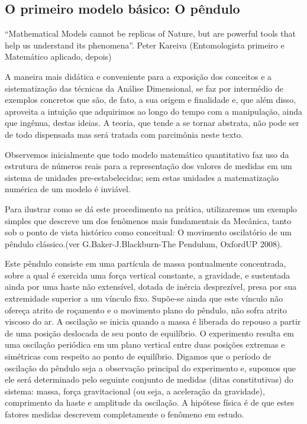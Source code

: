 \subsection{O primeiro modelo básico: O pêndulo}

“Mathematical Models cannot be replicas of Nature, but are powerful tools that help us understand its phenomena”.
Peter Kareiva (Entomologista primeiro e Matemático aplicado, depois)

A maneira mais didática e conveniente para a exposição dos conceitos e a sistematização das técnicas da Análise Dimensional, se faz por intermédio de exemplos concretos que são, de fato, a sua origem e finalidade e, que além disso, aproveita a intuição que adquirimos ao longo do tempo com a manipulação, ainda que ingênua, destas ideias. A teoria, que tende a se tornar abstrata, não pode ser de todo dispensada mas será tratada com parcimônia neste texto.

Observemos inicialmente que todo modelo matemático quantitativo faz uso da estrutura de números reais para a representação dos valores de medidas em um sistema de unidades pre-estabelecidas; sem estas unidades a matematização numérica de um modelo é inviável.

Para ilustrar como se dá este procedimento na prática, utilizaremos um exemplo simples que descreve um dos fenômenos mais fundamentais da Mecânica, tanto sob o ponto de vista histórico como conceitual: O movimento oscilatório de um pêndulo clássico.(ver G.Baker-J.Blackburn-The Pendulum, OxfordUP 2008).

Este pêndulo consiste em uma partícula de massa pontualmente concentrada, sobre a qual é exercida uma força vertical constante, a gravidade, e sustentada ainda por uma haste não extensível, dotada de inércia desprezível, presa por sua extremidade superior a um vínculo fixo. Supõe-se ainda que este vínculo não ofereça atrito de roçamento e o movimento plano do pêndulo, não sofra atrito viscoso do ar. A oscilação se inicia quando a massa é liberada do repouso a partir de uma posição deslocada de seu ponto de equilíbrio. O experimento resulta em uma oscilação periódica em um plano vertical entre duas posições extremas e simétricas com respeito ao ponto de equilíbrio. Digamos que o período de oscilação do pêndulo seja a observação principal do experimento e, supomos que ele será determinado pelo seguinte conjunto de medidas (ditas constitutivas) do sistema: massa, força gravitacional (ou seja, a aceleração da gravidade), comprimento da haste e amplitude da oscilação. A hipótese física é de que estes fatores medidas descrevem completamente o fenômeno em estudo.

